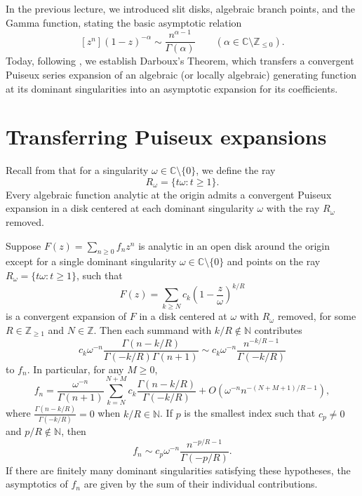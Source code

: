 
In the previous lecture, we introduced slit disks, algebraic branch points, and the Gamma function, stating the basic asymptotic relation
\[
    [z^n] (1 - z)^{-\alpha} \sim \frac{n^{\alpha - 1}}{\Gamma(\alpha)} \qquad (\alpha \in \mathbb{C} \setminus \mathbb{Z}_{\le 0}).
\]
Today, following \cite[Section 2.3]{Melczer2021}, we establish Darboux's Theorem, which transfers a convergent Puiseux series expansion of an algebraic (or locally algebraic) generating function at its dominant singularities into an asymptotic expansion for its coefficients.


\section*{Transferring Puiseux expansions}

Recall from \cite[Definition 2.12]{Melczer2021} that for a singularity \(\omega \in \mathbb{C} \setminus \{0\}\), we define the ray
\[
    R_\omega = \{ t\omega : t \ge 1 \}.
\]
Every algebraic function analytic at the origin admits a convergent Puiseux expansion in a disk centered at each dominant singularity \(\omega\) with the ray \(R_\omega\) removed.

\begin{proposition}
    \label{prop:darboux}
    Suppose \(F(z) = \sum_{n \ge 0} f_n z^n\) is analytic in an open disk around the origin except for a single dominant singularity \(\omega \in \mathbb{C} \setminus \{0\}\) and points on the ray \(R_\omega = \{t\omega : t \ge 1\}\), such that
    \[
        F(z) = \sum_{k \ge N} c_k \left( 1 - \frac{z}{\omega} \right)^{k/R}
    \]
    is a convergent expansion of \(F\) in a disk centered at \(\omega\) with \(R_\omega\) removed, for some \(R \in \mathbb{Z}_{\ge 1}\) and \(N \in \mathbb{Z}\).
    Then each summand with \(k/R \notin \mathbb{N}\) contributes
    \[
        c_k \omega^{-n} \frac{\Gamma(n - k/R)}{\Gamma(-k/R) \Gamma(n+1)} \sim c_k \omega^{-n} \frac{n^{-k/R - 1}}{\Gamma(-k/R)}
    \]
    to \(f_n\). In particular, for any \(M \ge 0\),
    \[
        f_n = \frac{\omega^{-n}}{\Gamma(n+1)} \sum_{k=N}^{N+M} c_k \frac{\Gamma(n - k/R)}{\Gamma(-k/R)} + O\left( \omega^{-n} n^{-(N+M+1)/R - 1} \right),
    \]
    where \(\frac{\Gamma(n - k/R)}{\Gamma(-k/R)} = 0\) when \(k/R \in \mathbb{N}\).
    If \(p\) is the smallest index such that \(c_p \neq 0\) and \(p/R \notin \mathbb{N}\), then
    \[
        f_n \sim c_p \omega^{-n} \frac{n^{-p/R - 1}}{\Gamma(-p/R)}.
    \]
    If there are finitely many dominant singularities satisfying these hypotheses, the asymptotics of \(f_n\) are given by the sum of their individual contributions.
\end{proposition}


